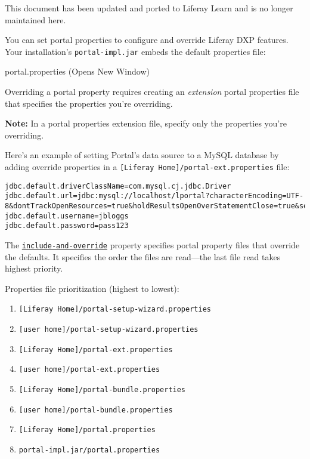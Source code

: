 {This document has been updated and ported to Liferay Learn and is no
longer maintained here.}

You can set portal properties to configure and override Liferay DXP
features. Your installation's \texttt{portal-impl.jar} embeds the
default properties file:

{ portal.properties { (Opens New Window)} }

Overriding a portal property requires creating an \emph{extension}
portal properties file that specifies the properties you're overriding.

\noindent\hrulefill

\textbf{Note:} In a portal properties extension file, specify only the
properties you're overriding.

\noindent\hrulefill

Here's an example of setting Portal's data source to a MySQL database by
adding override properties in a
\texttt{{[}Liferay\ Home{]}/portal-ext.properties} file:

\begin{verbatim}
jdbc.default.driverClassName=com.mysql.cj.jdbc.Driver
jdbc.default.url=jdbc:mysql://localhost/lportal?characterEncoding=UTF-8&dontTrackOpenResources=true&holdResultsOpenOverStatementClose=true&serverTimezone=GMT&useFastDateParsing=false&useUnicode=true
jdbc.default.username=jbloggs
jdbc.default.password=pass123
\end{verbatim}

The
\href{@platform-ref@/7.2-latest/propertiesdoc/portal.properties.html\#Properties\%20Override}{\texttt{include-and-override}}
property specifies portal property files that override the defaults. It
specifies the order the files are read---the last file read takes
highest priority.

Properties file prioritization (highest to lowest):

\begin{enumerate}
\def\labelenumi{\arabic{enumi}.}
\tightlist
\item
  \texttt{{[}Liferay\ Home{]}/portal-setup-wizard.properties}
\item
  \texttt{{[}user\ home{]}/portal-setup-wizard.properties}
\item
  \texttt{{[}Liferay\ Home{]}/portal-ext.properties}
\item
  \texttt{{[}user\ home{]}/portal-ext.properties}
\item
  \texttt{{[}Liferay\ Home{]}/portal-bundle.properties}
\item
  \texttt{{[}user\ home{]}/portal-bundle.properties}
\item
  \texttt{{[}Liferay\ Home{]}/portal.properties}
\item
  \texttt{portal-impl.jar/portal.properties}
\end{enumerate}

